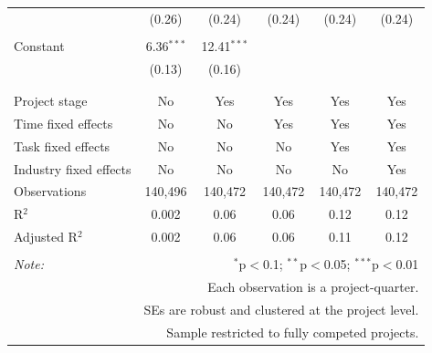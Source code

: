\documentclass[
]{article}
\begin{document}
\begin{table}[H]
\begin{tabular}{@{\extracolsep{-2pt}}lccccc}
  & (0.26) & (0.24) & (0.24) & (0.24) & (0.24) \\ 
  & & & & & \\ 
 Constant & 6.36$^{***}$ & 12.41$^{***}$ &  &  &  \\ 
  & (0.13) & (0.16) &  &  &  \\ 
  & & & & & \\ 
\hline \\[-1.8ex] 
Project stage & No & Yes & Yes & Yes & Yes \\ 
Time fixed effects & No & No & Yes & Yes & Yes \\ 
Task fixed effects & No & No & No & Yes & Yes \\ 
Industry fixed effects & No & No & No & No & Yes \\ 
Observations & 140,496 & 140,472 & 140,472 & 140,472 & 140,472 \\ 
R$^{2}$ & 0.002 & 0.06 & 0.06 & 0.12 & 0.12 \\ 
Adjusted R$^{2}$ & 0.002 & 0.06 & 0.06 & 0.11 & 0.12 \\ 
\hline 
\hline \\[-1.8ex] 
\textit{Note:}  & \multicolumn{5}{r}{$^{*}$p$<$0.1; $^{**}$p$<$0.05; $^{***}$p$<$0.01} \\ 
 & \multicolumn{5}{r}{Each observation is a project-quarter.} \\ 
 & \multicolumn{5}{r}{SEs are robust and clustered at the project level.} \\ 
 & \multicolumn{5}{r}{Sample restricted to fully competed projects.} \\ 
\end{tabular} 
\end{table}
\end{document}
